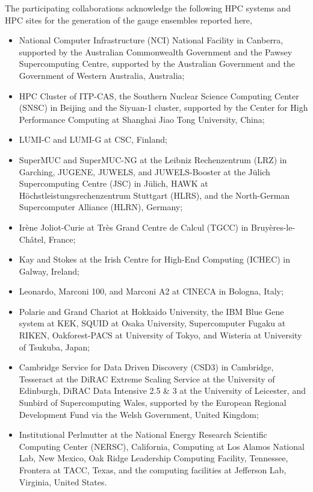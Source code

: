 \documentclass[a4paper,11pt]{article}
\begin{document}
The participating collaborations acknowledge the following HPC systems
and HPC sites for the generation of the gauge ensembles reported here,

\begin{itemize}[leftmargin=*, align=left, itemsep=1pt, topsep=0pt, parsep=0pt]
\item National Computer Infrastructure (NCI) National Facility in
  Canberra, supported by the Australian Commonwealth Government and
  the Pawsey Supercomputing Centre, supported by the Australian
  Government and the Government of Western Australia, Australia;
  
\item HPC Cluster of ITP-CAS, the Southern Nuclear Science
  Computing Center (SNSC) in Beijing and the Siyuan-1 cluster,
  supported by the Center for High Performance Computing at Shanghai
  Jiao Tong University, China;
  
\item LUMI-C and LUMI-G at CSC, Finland;
  
\item SuperMUC and SuperMUC-NG at the Leibniz Rechenzentrum (LRZ) in
  Garching, JUGENE, JUWELS, and JUWELS-Booster at the Jülich
  Supercomputing Centre (JSC) in J\"ulich, HAWK at
  Höchstleistungsrechenzentrum Stuttgart (HLRS), and the
  North-German Supercomputer Alliance (HLRN), Germany;

\item  Irène Joliot-Curie at Très Grand Centre de Calcul (TGCC) in
  Bruyères-le-Châtel, France;

\item Kay and Stokes at the Irish Centre for High-End Computing
  (ICHEC) in Galway, Ireland;

\item Leonardo, Marconi 100, and Marconi A2 at CINECA in Bologna,
  Italy;
  
\item Polarie and Grand Chariot at Hokkaido University, the IBM Blue
  Gene system at KEK, SQUID at Osaka University, Supercomputer
  Fugaku at RIKEN, Oakforest-PACS at University of Tokyo, and
  Wisteria at University of Tsukuba, Japan;
  

\item Cambridge Service for Data Driven Discovery (CSD3) in Cambridge,
  Tesseract at the DiRAC Extreme Scaling Service at the University of
  Edinburgh, DiRAC Data Intensive 2.5 \& 3 at the University of
  Leicester, and Sunbird of Supercomputing Wales, supported by the
  European Regional Development Fund via the Welsh Government, United
  Kingdom;
    
\item Institutional Perlmutter at the National Energy Research
Scientific Computing Center (NERSC), California, Computing at Los
Alamos National Lab, New Mexico, Oak Ridge Leadership Computing
Facility, Tennessee, Frontera at TACC, Texas, and the computing
facilities at Jefferson Lab, Virginia, United States.
\end{itemize}


 
\end{document}
